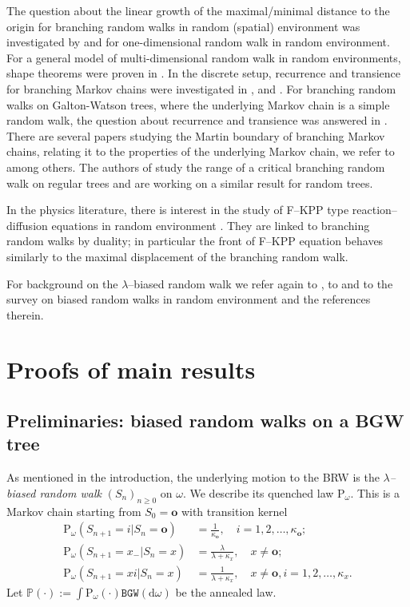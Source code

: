 \documentclass[11 pt]{article}
\theoremstyle{definition}
\numberwithin{equation}{section}
\newcommand{\dd}{\mathrm{d}} %
\newcommand{\PP}{\mathbb{P}} %
\newcommand{\rt}{\mathbf{o}} %
\newcommand{\Pws}{\mathrm{P}_{\omega}} %
\begin{document}
The question about the linear growth of the maximal/minimal distance to the origin for branching random walks in random (spatial) environment was investigated by \cite{Devulder2007} and \cite{ZhangHouHong2020} for one-dimensional random walk in random environment. For a general model of multi-dimensional random walk in random environments, shape theorems were proven in \cite{CometsPopov2007}. 
In the discrete setup, recurrence and transience for branching Markov chains were investigated in \cite{Benjamini-Peres-indexed},\cite{GantertMueller_critical_branching} and \cite{Mueller2008}.
For branching random walks on Galton-Watson trees, where the underlying Markov chain is a simple random walk, the question about recurrence and transience was answered in \cite{Su2014}.
There are several papers studying the Martin boundary of branching Markov chains, relating it to the properties of the underlying Markov chain, we refer to 
\cite{bertacchi_martin_2024, candellero_boundary_2023, kaimanovich_limit_2023} among others. The authors of \cite{duquesne_scaling_2022} study the range of a critical branching random walk on regular trees and are working on a similar result for random trees. 

In the physics literature, there is interest in the study of F--KPP type reaction--diffusion equations in random environment
  \cite{bianco_reaction_2013, burioni_reaction_2012, hoffman_invasion_2019}. They are linked to branching random walks by duality; in particular the front of F--KPP equation behaves similarly to the maximal displacement of the branching random walk. 
  
For background on the $\lambda$--biased random walk we refer again to \cite{lyons_probability_2016}, to \cite{shi_branching_2015} and to the survey \cite{ben_arous_biased_2016} on biased random walks in random environment and the references therein.


\section{Proofs of main results}
\subsection{Preliminaries: biased random walks on a BGW tree}\label{subsection:lambda_biased_rw}

As mentioned in the introduction, the underlying motion to the BRW is the \emph{$\lambda$--biased random walk} $(S_n)_{n\geq 0}$ on $\omega$. We describe its quenched law $\Pws$. This is a Markov chain starting from $S_0 = \rt$ with transition kernel 
\begin{align*}
	 \Pws(S_{n+1} = i | S_{n} =\rt) &=\frac{1}{\kappa_{\rt}},\quad i=1,2,\ldots, \kappa_{\rt};\\
	\Pws(S_{n+1} = x_- | S_{n} =x) &=\frac{\lambda}{\lambda +\kappa_x}, \quad x\ne \rt;\\
	 \Pws(S_{n+1} = xi | S_{n} =x) &=\frac{1}{\lambda +\kappa_x}, \quad x\ne \rt, i=1,2,\ldots, \kappa_x.
\end{align*}
Let $\PP(\cdot):= \int \Pws(\cdot) \mathtt{BGW}(\dd \omega)$ be the annealed law. 
\end{document}
